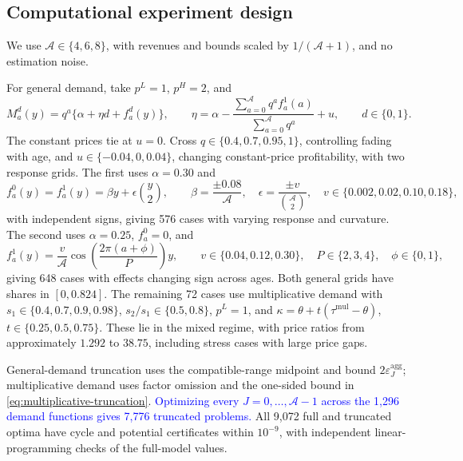\begin{table}[H]

\centering\small
\caption{True-demand regret (\%). Rows with \(\gamma>0\) pool six cases and 100 replications per case. Population excludes sampling noise. Mean, P95, and Max summarize fitted-policy regret. Constant uses the better true constant price.}
\label{tab:reference-robustness}
\setlength{\tabcolsep}{4pt}

\end{table}

\begingroup\color{black}
\subsection{Computational experiment design}
\label{app:approximation-design}
We use \(\mathcal A\in\{4,6,8\}\), with revenues and bounds scaled by \(1/(\mathcal A+1)\), and no estimation noise.

For general demand, take \(p^L=1\), \(p^H=2\), and
\[
 M_a^d(y)=q^a\{\alpha+\eta d+f_a^d(y)\},\qquad
 \eta=\alpha-\frac{\sum_{a=0}^{\mathcal A}q^af_a^1(a)}
                         {\sum_{a=0}^{\mathcal A}q^a}+u,
 \qquad d\in\{0,1\}.
\]
The constant prices tie at \(u=0\). Cross \(q\in\{0.4,0.7,0.95,1\}\), controlling fading with age, and \(u\in\{-0.04,0,0.04\}\), changing constant-price profitability, with two response grids. The first uses \(\alpha=0.30\) and
\[
 f_a^0(y)=f_a^1(y)=\beta y+\epsilon\binom y2,\qquad
 \beta=\frac{\pm0.08}{\mathcal A},\quad
 \epsilon=\frac{\pm v}{\binom{\mathcal A}{2}},\quad
 v\in\{0.002,0.02,0.10,0.18\},
\]
with independent signs, giving 576 cases with varying response and curvature. The second uses \(\alpha=0.25\), \(f_a^0=0\), and
\[
 f_a^1(y)=\frac{v}{\mathcal A}
       \cos\!\left(\frac{2\pi(a+\phi)}{P}\right)y,
 \qquad v\in\{0.04,0.12,0.30\},\quad
 P\in\{2,3,4\},\quad \phi\in\{0,1\},
\]
giving 648 cases with effects changing sign across ages. Both general grids have shares in \([0,0.824]\). The remaining 72 cases use multiplicative demand with \(s_1\in\{0.4,0.7,0.9,0.98\}\), \(s_2/s_1\in\{0.5,0.8\}\), \(p^L=1\), and \(\kappa=\theta+t(\tau^{\mathrm{mul}}-\theta)\), \(t\in\{0.25,0.5,0.75\}\). These lie in the mixed regime, with price ratios from approximately \(1.292\) to \(38.75\), including stress cases with large price gaps.


General-demand truncation uses the compatible-range midpoint and bound \(2\varepsilon_J^{\mathrm{agg}}\); multiplicative demand uses factor omission and the one-sided bound in \eqref{eq:multiplicative-truncation}. \textcolor{blue}{Optimizing every \(J=0,\ldots,\mathcal A-1\) across the 1,296 demand functions gives 7,776 truncated problems.} All 9,072 full and truncated optima have cycle and potential certificates within \(10^{-9}\), with independent linear-programming checks of the full-model values.

